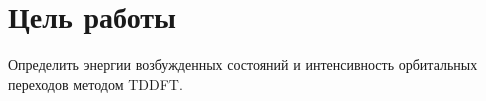 \section{Цель работы}
Определить энергии возбужденных состояний и интенсивность орбитальных переходов методом TDDFT.
